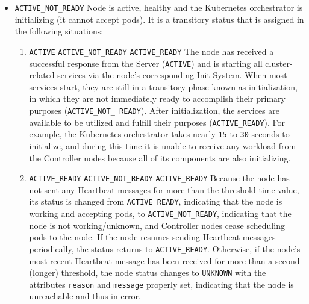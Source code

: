 \begin{itemize}
\begin{itemize}
      \item \texttt{ACTIVE\_NOT\_READY}
        \newline
        Node is active, healthy and the Kubernetes orchestrator is initializing (it
        cannot accept pods).
        \newline
        It is a transitory status that is assigned in the following situations:
        \begin{enumerate}
          \item \texttt{ACTIVE}  \texttt{ACTIVE\_NOT\_READY}
             \texttt{ACTIVE\_READY}
            \newline
            The node has received a successful response from the Server (\texttt{ACTIVE})
            and is starting all cluster-related services via the node's corresponding
            Init System. When most services start, they are still in a transitory
            phase known as initialization, in which they are not immediately
            ready to accomplish their primary purposes (\texttt{ACTIVE\_NOT\_
            READY}). After initialization, the services are available to be
            utilized and fulfill their purposes (\texttt{ACTIVE\_READY}).
            \newline
            For example, the Kubernetes orchestrator takes nearly \texttt{15} to
            \texttt{30} seconds to initialize, and during this time it is unable
            to receive any workload from the Controller nodes because all of its
            components are also initializing.

          \item \texttt{ACTIVE\_READY}  \texttt{ACTIVE\_NOT\_READY}
             \texttt{ACTIVE\_READY}
            \newline
            Because the node has not sent any Heartbeat messages for more than
            the threshold time value, its status is changed from \texttt{ACTIVE\_READY},
            indicating that the node is working and accepting pods, to \texttt{ACTIVE\_NOT\_READY},
            indicating that the node is not working/unknown, and Controller nodes
            cease scheduling pods to the node. If the node resumes sending
            Heartbeat messages periodically, the status returns to \texttt{ACTIVE\_READY}.
            Otherwise, if the node's most recent Heartbeat message has been
            received for more than a second (longer) threshold, the node status changes
            to \texttt{UNKNOWN} with the attributes \texttt{reason} and \texttt{message}
            properly set, indicating that the node is unreachable and thus in error.
        \end{enumerate}


\end{itemize}
\end{itemize}
